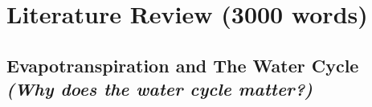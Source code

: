 \documentclass[paper=a4, fontsize=12pt]{scrartcl}
\begin{document}
\begin{titlepage}
		\vspace{5em}
		\begin{abstract} 
			{)}
			\newline
			
			\begin{itemize}
				\item Summary of background on ET/ML methods and FLUXNET 
				\item Overall aim of the project 
				\item Proposed approach for the project
			\end{itemize}
			
			\vspace{1em}
			\textit{\textbf{Key words:}} Machine Learning, FLUXNET, Evapotranspiration.\\
			\textit{\textbf{Word count:}} 3000
		\end{abstract}
	\end{titlepage}
	
	\newpage
	\tableofcontents
	\newpage

	
	\newpage
	
	
	\section{Literature Review (3000 words)}
	\subsection{Evapotranspiration and The Water Cycle \\ \textit{(Why does the water cycle matter?)}}
\end{document}
